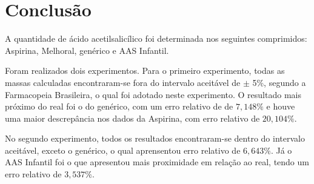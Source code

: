 \chapter{Conclusão}

A quantidade de ácido acetilsalicílico foi determinada nos seguintes comprimidos: Aspirina\R, 
Melhoral\R, genérico e AAS Infantil.

Foram realizados dois experimentos. Para o primeiro experimento, todas as massas calculadas
encontraram-se fora do intervalo aceitável de $\pm$ 5\%, segundo a Farmacopeia Brasileira, o qual
foi adotado neste experimento. O resultado mais próximo do real foi o do genérico, com um erro
relativo de de $7,148\%$ e houve uma maior descrepância nos dados da Aspirina\R, com erro relativo
de $20,104\%$.

No segundo experimento, todos os resultados encontraram-se dentro do intervalo aceitável, exceto o
genérico, o qual aprensentou erro relativo de $6,643\%$. Já o AAS Infantil foi o que apresentou mais
proximidade em relação ao real, tendo um erro relativo de $3,537\%$.
